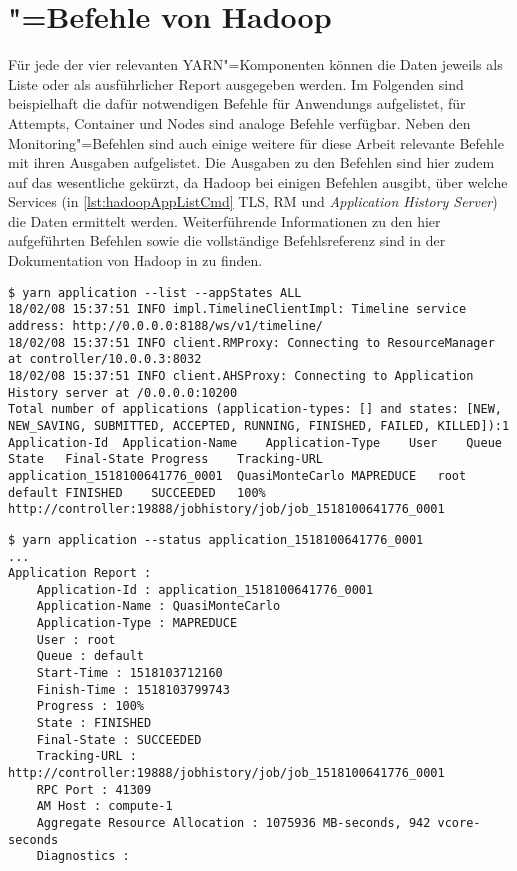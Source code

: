 \chapter{"=Befehle von Hadoop}
\label{app:hadoopCmds}

Für jede der vier relevanten YARN"=Komponenten können die Daten jeweils als Liste oder als ausführlicher Report ausgegeben werden.
Im Folgenden sind beispielhaft die dafür notwendigen Befehle für \glspl{Anwendung} aufgelistet, für Attempts, \gls{Container} und Nodes sind analoge Befehle verfügbar.
Neben den Monitoring"=Befehlen sind auch einige weitere für diese Arbeit relevante Befehle mit ihren Ausgaben aufgelistet.
Die Ausgaben zu den Befehlen sind hier zudem auf das wesentliche gekürzt, \uA da Hadoop bei einigen Befehlen ausgibt, über welche Services (in \cref{lst:hadoopAppListCmd} \zB \gls{TLS}, \gls{RM} und \emph{Application History Server}) die Daten ermittelt werden.
Weiterführende Informationen zu den hier aufgeführten Befehlen sowie die vollständige Befehlsreferenz sind in der Dokumentation von Hadoop in \cite{HadoopYarnCmds271} zu finden.

\begin{lstlisting}[label=lst:hadoopAppListCmd,style=plain,
caption={[\acrshort{CLI}"=Ausgabe der Anwendungsliste]
    \acrshort{CLI}"=Ausgabe der Anwendungsliste.
    \glspl{Anwendung} können mithilfe der Optionen \mbox{\texttt{-{}-appTypes}} und \mbox{\texttt{-{}-appStates}} gefiltert werden.}]
$ yarn application --list --appStates ALL
18/02/08 15:37:51 INFO impl.TimelineClientImpl: Timeline service address: http://0.0.0.0:8188/ws/v1/timeline/
18/02/08 15:37:51 INFO client.RMProxy: Connecting to ResourceManager at controller/10.0.0.3:8032
18/02/08 15:37:51 INFO client.AHSProxy: Connecting to Application History server at /0.0.0.0:10200
Total number of applications (application-types: [] and states: [NEW, NEW_SAVING, SUBMITTED, ACCEPTED, RUNNING, FINISHED, FAILED, KILLED]):1
Application-Id	Application-Name	Application-Type	User	Queue	State	Final-State	Progress	Tracking-URL
application_1518100641776_0001	QuasiMonteCarlo	MAPREDUCE	root	default	FINISHED	SUCCEEDED	100%	http://controller:19888/jobhistory/job/job_1518100641776_0001
\end{lstlisting}

\begin{lstlisting}[label=lst:hadoopAppDetailsCmd,style=plain,
caption={\acrshort{CLI}"=Ausgabe des Reports einer Anwendung}]
$ yarn application --status application_1518100641776_0001
...
Application Report : 
    Application-Id : application_1518100641776_0001
    Application-Name : QuasiMonteCarlo
    Application-Type : MAPREDUCE
    User : root
    Queue : default
    Start-Time : 1518103712160
    Finish-Time : 1518103799743
    Progress : 100%
    State : FINISHED
    Final-State : SUCCEEDED
    Tracking-URL : http://controller:19888/jobhistory/job/job_1518100641776_0001
    RPC Port : 41309
    AM Host : compute-1
    Aggregate Resource Allocation : 1075936 MB-seconds, 942 vcore-seconds
    Diagnostics :
\end{lstlisting}

